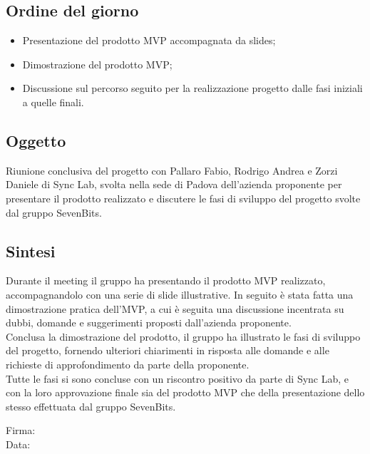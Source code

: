 \documentclass[10pt]{article}
\begin{document}
\subsection{Ordine del giorno}
\begin{itemize}
    \item Presentazione del prodotto MVP accompagnata da slides;
    \item Dimostrazione del prodotto MVP;
    \item Discussione sul percorso seguito per la realizzazione progetto dalle fasi iniziali a quelle finali.
\end{itemize}

\subsection{Oggetto}
Riunione conclusiva del progetto con Pallaro Fabio, Rodrigo Andrea e Zorzi Daniele di Sync Lab, svolta nella sede di Padova dell'azienda proponente
per presentare il prodotto realizzato e discutere le fasi di sviluppo del progetto svolte dal gruppo SevenBits.

\subsection{Sintesi}
Durante il meeting il gruppo ha presentando il prodotto MVP realizzato, accompagnandolo con una serie di slide illustrative. In seguito è stata fatta una dimostrazione pratica
dell'MVP, a cui è seguita una discussione incentrata su dubbi, domande e suggerimenti proposti dall'azienda proponente.\\
Conclusa la dimostrazione del prodotto, il gruppo ha illustrato le fasi di sviluppo del progetto, fornendo ulteriori chiarimenti in risposta alle domande e alle richieste di approfondimento da parte 
della proponente.\\
Tutte le fasi si sono concluse con un riscontro positivo da parte di Sync Lab, e con la loro approvazione finale sia del prodotto MVP che della presentazione dello stesso
effettuata dal gruppo SevenBits.\\


\vfill
\begin{minipage}{10cm}
Firma: \hrulefill \\
\vspace{2mm}
Data: \dotfill
\end{minipage}
\end{document}
